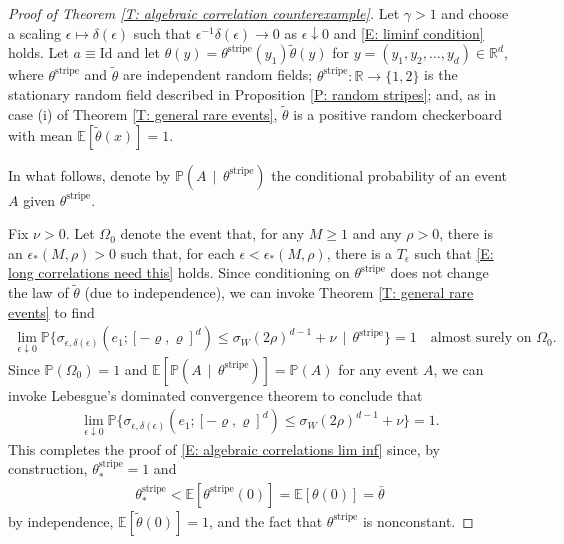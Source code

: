 \documentclass[12pt]{amsart}
\begin{document}
\begin{proof}[Proof of Theorem \ref{T: algebraic correlation counterexample}] Let $\gamma > 1$ and choose a scaling $\epsilon \mapsto \delta(\epsilon)$ such that $\epsilon^{-1} \delta(\epsilon) \to 0$ as $\epsilon \downarrow 0$ and \eqref{E: liminf condition} holds.  Let $a \equiv \text{Id}$ and let $\theta(y) = \theta^{\text{stripe}}(y_{1}) \tilde{\theta}(y)$ for $y = (y_{1},y_{2},\dots,y_{d}) \in \mathbb{R}^{d}$, where $\theta^{\text{stripe}}$ and $\tilde{\theta}$ are independent random fields; $\theta^{\text{stripe}} : \mathbb{R} \to \{1,2\}$ is the stationary random field described in Proposition \ref{P: random stripes}; and, as in case (i) of  Theorem \ref{T: general rare events}, $\tilde{\theta}$ is a positive random checkerboard with mean $\mathbb{E} [ \tilde{\theta}(x) ] = 1$.

In what follows, denote by $\mathbb{P}(A \, \mid \, \theta^{\text{stripe}} )$ the conditional probability of an event $A$ given $\theta^{\text{stripe}}$.

Fix $\nu > 0$.  Let $\Omega_{0}$ denote the event that, for any $M \geq 1$ and any $\rho > 0$, there is an $\epsilon_{*}(M,\rho) > 0$ such that, for each $\epsilon < \epsilon_{*}(M,\rho)$, there is a $T_{\epsilon}$ such that \eqref{E: long correlations need this} holds.
Since conditioning on $\theta^{\text{stripe}}$ does not change the law of $\tilde{\theta}$ (due to independence), we can invoke Theorem \ref{T: general rare events} to find
\begin{align*}
\lim_{ \epsilon \downarrow 0 } \mathbb{P} \{ \sigma_{\epsilon,\delta(\epsilon)}(e_{1}; [-\varrho,\varrho]^{d} )  \leq \sigma_{W} ( 2 \rho )^{d-1} + \nu \, \mid \, \theta^{\text{stripe}} \} = 1 \quad \text{almost surely on} \, \, \Omega_{0}.
\end{align*}
Since $\mathbb{P}(\Omega_{0}) = 1$ and $\mathbb{E}[ \mathbb{P}(A \, \mid \, \theta^{\text{stripe}} ) ] = \mathbb{P}(A)$ for any event $A$, we can invoke Lebesgue's dominated convergence theorem to conclude that
\begin{align*}
\lim_{ \epsilon \downarrow 0 } \mathbb{P} \{ \sigma_{\epsilon,\delta(\epsilon)}(e_{1}; [-\varrho,\varrho]^{d} ) \leq \sigma_{W} ( 2 \rho )^{d-1} + \nu \} = 1 .
\end{align*}
This completes the proof of \eqref{E: algebraic correlations lim inf} since, by construction, $\theta^{\text{stripe}}_{*} = 1$ and 
	\begin{align*}
		\theta^{\text{stripe}}_{*} < \mathbb{E} [ \theta^{\text{stripe}}(0) ] = \mathbb{E} [ \theta(0) ] = \bar{\theta}
	\end{align*}
by independence, $\mathbb{E}[\tilde{\theta}(0)] = 1$, and the fact that $\theta^{\text{stripe}}$ is nonconstant.
\end{proof}
\end{document}
